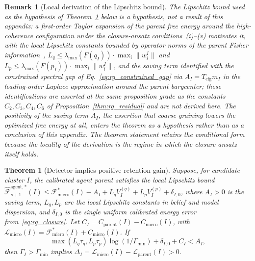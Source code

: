 \documentclass[11pt]{article}
\newtheorem{theorem}{Theorem}
\newtheorem{remark}{Remark}
\begin{document}
\begin{remark}[Local derivation of the Lipschitz bound]
The Lipschitz bound used as the hypothesis of Theorem~\ref{thm:rg_detector_retention} below is a hypothesis, not a result of this appendix: a first-order Taylor expansion of the parent free energy around the high-coherence configuration under the closure-ansatz conditions~(i)--(v) motivates it, with the local Lipschitz constants bounded by operator norms of the parent Fisher information~\cite{Amari2016}, $L_q \le \lambda_{\max}(F(q_I)) \cdot \max_i\|w_i^I\|$ and $L_p \le \lambda_{\max}(F(p_I)) \cdot \max_i\|w_i^I\|$, and the saving term identified with the constrained spectral gap of Eq.~\eqref{eq:rg_constrained_gap} via $A_I = T_{\mathrm{cfg}}m_I$ in the leading-order Laplace approximation around the parent barycenter; these identifications are asserted at the same proposition grade as the constants $C_2, C_3, C_4, C_6$ of Proposition~\ref{thm:rg_residual} and are not derived here. The positivity of the saving term $A_I$, the assertion that coarse-graining lowers the optimized free energy at all, enters the theorem as a hypothesis rather than as a conclusion of this appendix. The theorem statement retains the conditional form because the locality of the derivation is the regime in which the closure ansatz itself holds.
\end{remark}

\begin{theorem}[Detector implies positive retention gain]
\label{thm:rg_detector_retention}
Suppose, for candidate cluster $I$, the calibrated agent parent satisfies the local Lipschitz bound $\widehat{\mathcal{F}}_{s+1}^{\mathrm{agent},*}(I) \le \mathcal{F}_{\mathrm{micro}}^*(I) - A_I + L_q V_I^{(q)} + L_p V_I^{(p)} + \delta_{I,0}$, where $A_I > 0$ is the saving term, $L_q, L_p$ are the local Lipschitz constants in belief and model dispersion, and $\delta_{I,0}$ is the single uniform calibrated energy error from~\eqref{eq:rg_closure}. Let $C_I = C_{\mathrm{parent}}(I) - C_{\mathrm{micro}}(I)$, with $\mathcal{L}_{\mathrm{micro}}(I) = \mathcal{F}_{\mathrm{micro}}^*(I) + C_{\mathrm{micro}}(I)$. If
\begin{equation}
\max(L_q\tau_q, L_p\tau_p)\log(1/\Gamma_{\min}) + \delta_{I,0} + C_I < A_I,
\label{eq:rg_app_detector_retention}
\end{equation}
then $\Gamma_I > \Gamma_{\min}$ implies $\Delta_I = \mathcal{L}_{\mathrm{micro}}(I) - \mathcal{L}_{\mathrm{parent}}(I) > 0$.
\end{theorem}
\end{document}
